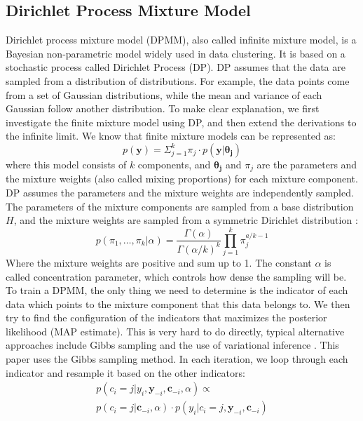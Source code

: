 \subsection{Dirichlet Process Mixture Model}
Dirichlet process mixture model (DPMM), also called infinite mixture model, is a Bayesian non-parametric model widely used in data clustering. 
It is based on a stochastic process called Dirichlet Process (DP).
DP assumes that the data are sampled from a distribution of distributions. For example, the data points come from a set of Gaussian distributions, while the mean and variance of each Gaussian follow another distribution. 
To make clear explanation, we first investigate the finite mixture model using DP, and then extend the derivations to the infinite limit.
We know that finite mixture models can be represented as:
\begin{equation}
p(\bm{y}) = \Sigma_{j=1}^k \pi_j \cdot p(\bm{y}|\bm{\theta_j})
\label{finite_mixture_model}
\end{equation}
where this model consists of $k$ components, and $\bm{\theta_j}$ and $\pi_j$ are the parameters and the mixture weights (also called mixing proportions) for each mixture component.
DP assumes the parameters and the mixture weights are independently sampled. 
The parameters of the mixture components are sampled from a base distribution $H$, and the mixture weights are sampled from a symmetric Dirichlet distribution \cite{DP}:
 \begin{equation}
p(\pi_1, \dots, \pi_k | \alpha) = 
\frac{\Gamma(\alpha)}{\Gamma(\alpha / k)^k} \prod_{j=1}^k \pi_j^{a/k - 1}
\label{Dirichlet_distribution}
\end{equation}
Where the mixture weights are positive and sum up to 1. The constant $\alpha$ is called concentration parameter, which controls how dense the sampling will be.
To train a DPMM, the only thing we need to determine is the indicator of each data which points to the mixture component that this data belongs to. 
We then try to find the configuration of the indicators that maximizes the posterior likelihood (MAP estimate). 
This is very hard to do directly, typical alternative approaches include Gibbs sampling \cite{Gibbs_sampling, Gibbs} and the use of variational inference \cite{variational_method}.
This paper uses the Gibbs sampling method. 
In each iteration, we loop through each indicator and resample it based on the other indicators:
\begin{equation}
\begin{gathered}
p(c_i = j|y_i, \bm{y}_{-i}, \bm{c}_{-i}, \alpha) 
\propto  \\
p(c_i = j|\bm{c}_{-i}, \alpha) \cdot
p(y_i|c_i=j, \bm{y}_{-i}, \bm{c}_{-i})
\end{gathered}
\label{indicator_posterior}
\end{equation}
